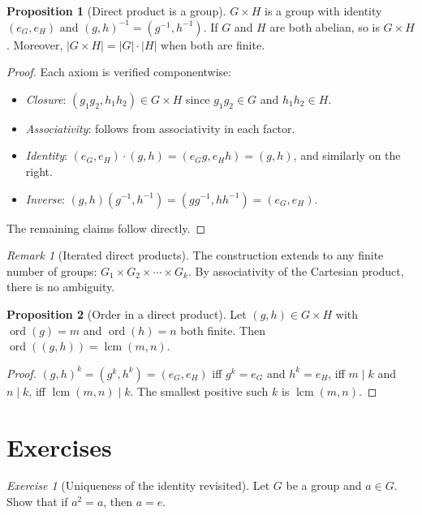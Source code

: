 \documentclass[12pt,a4paper,openany]{book}
\theoremstyle{definition}
\newtheorem{proposition}{Proposition}[chapter]
\theoremstyle{remark}
\newtheorem{remark}{Remark}[chapter]
\newtheorem{exercise}{Exercise}[chapter]
\DeclareMathOperator{\ord}{ord}
\DeclareMathOperator{\lcm}{lcm}
\begin{document}
\begin{proposition}[Direct product is a group]
\label{prop:direct-product-group}
$G\times H$ is a group with identity $(e_G,e_H)$ and
$(g,h)^{-1}=(g^{-1},h^{-1})$.  If $G$ and $H$ are both abelian, so is
$G\times H$.  Moreover, $|G\times H|=|G|\cdot|H|$ when both are finite.
\end{proposition}

\begin{proof}
Each axiom is verified componentwise:
\begin{itemize}
  \item \emph{Closure}: $(g_1g_2,h_1h_2)\in G\times H$ since $g_1g_2\in G$
    and $h_1h_2\in H$.
  \item \emph{Associativity}: follows from associativity in each factor.
  \item \emph{Identity}: $(e_G,e_H)\cdot(g,h)=(e_Gg,e_Hh)=(g,h)$, and
    similarly on the right.
  \item \emph{Inverse}: $(g,h)(g^{-1},h^{-1})=(gg^{-1},hh^{-1})=
    (e_G,e_H)$.
\end{itemize}
The remaining claims follow directly.
\end{proof}

\begin{remark}[Iterated direct products]
\label{rem:iterated-products}
The construction extends to any finite number of groups:
$G_1\times G_2\times\cdots\times G_k$.  By associativity of the Cartesian
product, there is no ambiguity.
\end{remark}

\begin{proposition}[Order in a direct product]
\label{prop:order-direct-product}
Let $(g,h)\in G\times H$ with $\ord(g)=m$ and $\ord(h)=n$ both finite.
Then $\ord((g,h))=\lcm(m,n)$.
\end{proposition}

\begin{proof}
$(g,h)^k=(g^k,h^k)=(e_G,e_H)$ iff $g^k=e_G$ and $h^k=e_H$, iff $m\mid k$
and $n\mid k$, iff $\lcm(m,n)\mid k$.  The smallest positive such $k$ is
$\lcm(m,n)$.
\end{proof}

\section{Exercises}
\label{sec:ch1-exercises}

\begin{exercise}[Uniqueness of the identity revisited]
\label{exer:ch1-1}
Let $G$ be a group and $a\in G$.  Show that if $a^2=a$, then $a=e$.
\end{exercise}
\end{document}
